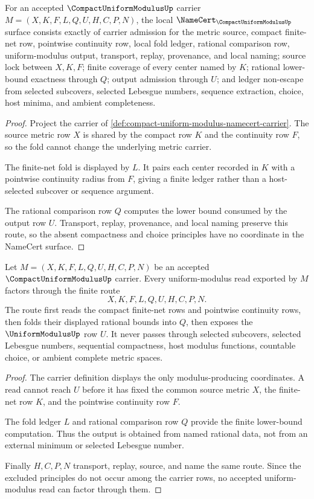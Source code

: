 \begin{theorem}
\label{thm:compact-uniform-modulus-namecert-obligations}
For an accepted $\CompactUniformModulusUp$ carrier $M=(X,K,F,L,Q,U,H,C,P,N)$, the local $\NameCert_{\CompactUniformModulusUp}$ surface consists exactly of carrier admission for the metric source, compact finite-net row, pointwise continuity row, local fold ledger, rational comparison row, uniform-modulus output, transport, replay, provenance, and local naming; source lock between $X,K,F$; finite coverage of every center named by $K$; rational lower-bound exactness through $Q$; output admission through $U$; and ledger non-escape from selected subcovers, selected Lebesgue numbers, sequence extraction, choice, host minima, and ambient completeness.
\end{theorem}
\begin{proof}
Project the carrier of \autoref{def:compact-uniform-modulus-namecert-carrier}. The source metric row $X$ is shared by the compact row $K$ and the continuity row $F$, so the fold cannot change the underlying metric carrier.

The finite-net fold is displayed by $L$. It pairs each center recorded in $K$ with a pointwise continuity radius from $F$, giving a finite ledger rather than a host-selected subcover or sequence argument.

The rational comparison row $Q$ computes the lower bound consumed by the output row $U$. Transport, replay, provenance, and local naming preserve this route, so the absent compactness and choice principles have no coordinate in the NameCert surface.
\end{proof}

\begin{theorem}
\label{thm:compact-uniform-modulus-finite-net-fold}
Let $M=(X,K,F,L,Q,U,H,C,P,N)$ be an accepted $\CompactUniformModulusUp$ carrier. Every uniform-modulus read exported by $M$ factors through the finite route
$$
X,K,F,L,Q,U,H,C,P,N .
$$
The route first reads the compact finite-net rows and pointwise continuity rows, then folds their displayed rational bounds into $Q$, then exposes the $\UniformModulusUp$ row $U$. It never passes through selected subcovers, selected Lebesgue numbers, sequential compactness, host modulus functions, countable choice, or ambient complete metric spaces.
\end{theorem}
\begin{proof}
The carrier definition displays the only modulus-producing coordinates. A read cannot reach $U$ before it has fixed the common source metric $X$, the finite-net row $K$, and the pointwise continuity row $F$.

The fold ledger $L$ and rational comparison row $Q$ provide the finite lower-bound computation. Thus the output is obtained from named rational data, not from an external minimum or selected Lebesgue number.

Finally $H,C,P,N$ transport, replay, source, and name the same route. Since the excluded principles do not occur among the carrier rows, no accepted uniform-modulus read can factor through them.
\end{proof}

